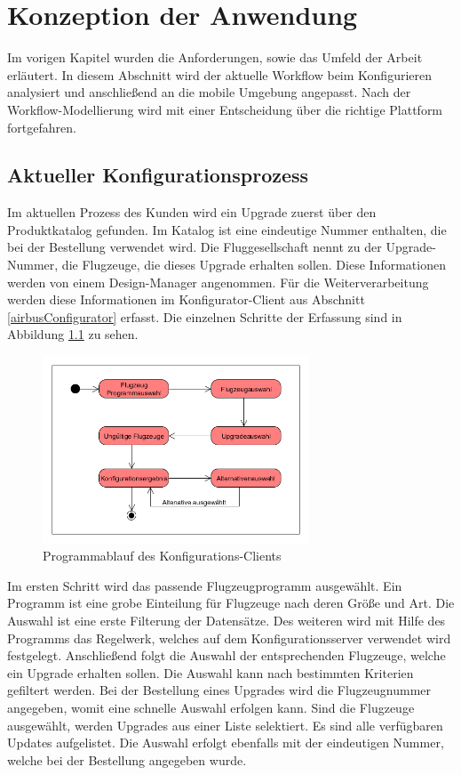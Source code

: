 \chapter{Konzeption der Anwendung}\label{chapter_3}
Im vorigen Kapitel wurden die Anforderungen, sowie das Umfeld der Arbeit erläutert. In diesem Abschnitt wird der aktuelle Workflow beim Konfigurieren analysiert und anschließend an die mobile Umgebung angepasst. Nach der Workflow-Modellierung wird mit einer Entscheidung über die richtige Plattform fortgefahren.

\section{Aktueller Konfigurationsprozess}
Im aktuellen Prozess des Kunden wird ein Upgrade zuerst über den Produktkatalog gefunden. Im Katalog ist eine eindeutige Nummer enthalten, die bei der Bestellung verwendet wird. Die Fluggesellschaft nennt zu der Upgrade-Nummer, die Flugzeuge, die dieses Upgrade erhalten sollen. Diese Informationen werden von einem Design-Manager angenommen. Für die Weiterverarbeitung werden diese Informationen im Konfigurator-Client aus Abschnitt \ref{airbusConfigurator} erfasst. Die einzelnen Schritte der Erfassung sind in Abbildung \ref{webguiWorkflow} zu sehen. \par
\begin{figure}
\label{webguiWorkflow}
\centering
\includegraphics[width=300px]{images/workflow_webgui}
\caption{Programmablauf des Konfigurations-Clients}
\end{figure}
Im ersten Schritt wird das passende Flugzeugprogramm ausgewählt. Ein Programm ist eine grobe Einteilung für Flugzeuge nach deren Größe und Art. Die Auswahl ist eine erste Filterung der Datensätze. Des weiteren wird mit Hilfe des Programms das Regelwerk, welches auf dem Konfigurationsserver verwendet wird festgelegt. Anschließend folgt die Auswahl der entsprechenden Flugzeuge, welche ein Upgrade erhalten sollen. Die Auswahl kann nach bestimmten Kriterien gefiltert werden. Bei der Bestellung eines Upgrades wird die Flugzeugnummer angegeben, womit eine schnelle Auswahl erfolgen kann. Sind die Flugzeuge ausgewählt, werden Upgrades aus einer Liste selektiert. Es sind alle verfügbaren Updates aufgelistet. Die Auswahl erfolgt ebenfalls mit der eindeutigen Nummer, welche bei der Bestellung angegeben wurde. \par 

